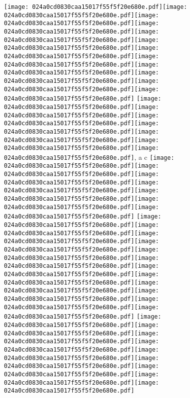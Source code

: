 \documentclass{article}
\newcommand{\origpg}[2]{\texttt{[image: 024a0cd0830caa15017f55f5f20e680e.pdf]}}
\begin{document}
{\vspace{0.416pt}\origpg{13}{85.303pt 292.52pt 93.147pt 308.66pt}\hspace{-0.613pt}\origpg{13}{92.534pt 292.52pt 100.6pt 308.66pt}\hspace{-0.113pt}\origpg{13}{100.49pt 292.52pt 109.13pt 308.66pt}\origpg{13}{109.13pt 292.52pt 119.58pt 308.66pt}\origpg{13}{119.52pt 292.52pt 128.16pt 308.66pt}\origpg{13}{128.16pt 292.52pt 134.77pt 308.66pt}\origpg{13}{134.69pt 292.52pt 142.76pt 308.66pt}\hspace{-0.355pt}\origpg{13}{142.41pt 292.52pt 150.48pt 308.66pt}\origpg{13}{150.57pt 292.52pt 157.74pt 308.66pt}\origpg{13}{157.79pt 292.52pt 166.42pt 308.66pt}\origpg{13}{166.42pt 292.52pt 175.06pt 308.66pt}\hspace{-0.161pt}\origpg{13}{174.9pt 292.52pt 183.53pt 308.66pt} \origpg{13}{194.15pt 292.52pt 201.32pt 308.66pt}\hspace{-0.178pt}\origpg{13}{201.14pt 292.52pt 209.78pt 308.66pt}\origpg{13}{209.78pt 292.52pt 216.94pt 308.66pt}\origpg{13}{217.02pt 292.52pt 224.08pt 308.66pt}\origpg{13}{224.01pt 292.52pt 231.18pt 308.66pt}\hspace{-0.178pt}\origpg{13}{231pt 292.52pt 241.22pt 308.66pt}\origpg{13}{241.12pt 292.52pt 251.97pt 308.66pt}\hspace{0.114pt}, a c \origpg{13}{301.97pt 292.52pt 310.6pt 308.66pt}\origpg{13}{310.6pt 292.52pt 318.67pt 308.66pt}\hspace{-0.323pt}\origpg{13}{318.35pt 292.52pt 328.57pt 308.66pt}\origpg{13}{328.47pt 292.52pt 336.54pt 308.66pt}\hspace{-0.113pt}\origpg{13}{336.43pt 292.52pt 348.86pt 308.66pt}\origpg{13}{348.94pt 292.52pt 356.3pt 308.66pt}\origpg{13}{356.39pt 292.52pt 368.45pt 308.66pt} \origpg{13}{378.78pt 292.52pt 387.41pt 308.66pt}\origpg{13}{387.41pt 292.52pt 394.58pt 308.66pt}\hspace{-0.145pt}\origpg{13}{394.44pt 292.52pt 401.6pt 308.66pt}\origpg{13}{401.65pt 292.52pt 409.7pt 308.66pt}\origpg{13}{409.61pt 292.52pt 416.77pt 308.66pt}\hspace{-0.42pt}\origpg{13}{416.35pt 292.52pt 424.57pt 308.66pt}\origpg{13}{424.57pt 292.52pt 432.64pt 308.66pt}\hspace{-0.145pt}\origpg{13}{432.49pt 292.52pt 440.11pt 308.66pt}\hspace{-0.145pt}\origpg{13}{439.97pt 292.52pt 447.13pt 308.66pt}\origpg{13}{447.18pt 292.52pt 455.82pt 308.66pt}\origpg{13}{455.82pt 292.52pt 464.45pt 308.66pt}\origpg{13}{464.52pt 292.52pt 471.94pt 308.66pt} \origpg{13}{482.34pt 292.52pt 490.41pt 308.66pt}\hspace{-0.355pt}\origpg{13}{490.05pt 292.52pt 497.1pt 308.66pt}\hspace{-0.307pt}\origpg{13}{496.8pt 292.52pt 505.01pt 308.66pt}\origpg{13}{505.01pt 292.52pt 512.18pt 308.66pt}\hspace{-0.21pt}\origpg{13}{511.97pt 292.52pt 520.02pt 308.66pt}\origpg{13}{519.93pt 292.52pt 527.29pt 308.66pt}\origpg{13}{527.38pt 292.52pt 536.02pt 308.66pt}\origpg{13}{536.02pt 292.52pt 546.86pt 308.66pt}\origpg{13}{546.86pt 292.52pt 554.94pt 308.66pt} 

}
\end{document}
